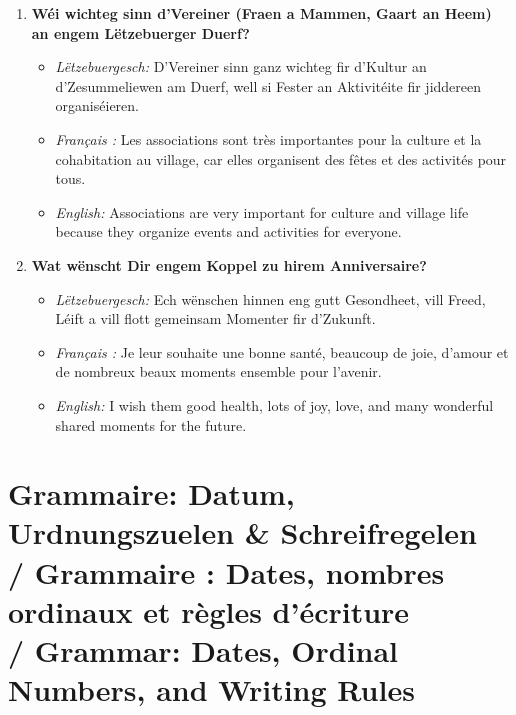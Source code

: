 \begin{enumerate}
    \item \textbf{Wéi wichteg sinn d'Vereiner (Fraen a Mammen, Gaart an Heem) an engem Lëtzebuerger Duerf?}
    \begin{itemize}
        \item \textit{Lëtzebuergesch:} D'Vereiner sinn ganz wichteg fir d'Kultur an d'Zesummeliewen am Duerf, well si Fester an Aktivitéite fir jiddereen organiséieren.
        \item \textit{Français :} Les associations sont très importantes pour la culture et la cohabitation au village, car elles organisent des fêtes et des activités pour tous.
        \item \textit{English:} Associations are very important for culture and village life because they organize events and activities for everyone.
    \end{itemize}

    \item \textbf{Wat wënscht Dir engem Koppel zu hirem Anniversaire?}
    \begin{itemize}
        \item \textit{Lëtzebuergesch:} Ech wënschen hinnen eng gutt Gesondheet, vill Freed, Léift a vill flott gemeinsam Momenter fir d'Zukunft.
        \item \textit{Français :} Je leur souhaite une bonne santé, beaucoup de joie, d'amour et de nombreux beaux moments ensemble pour l'avenir.
        \item \textit{English:} I wish them good health, lots of joy, love, and many wonderful shared moments for the future.
    \end{itemize}
\end{enumerate}

\vspace{1.5em}

\section[Grammaire / Grammar]{Grammaire: Datum, Urdnungszuelen \& Schreifregelen \\/ Grammaire : Dates, nombres ordinaux et règles d'écriture \\/ Grammar: Dates, Ordinal Numbers, and Writing Rules}

